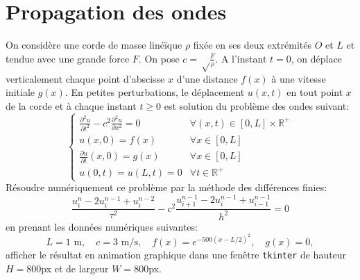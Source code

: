 \documentclass{article}
\begin{document}
\begin{center}
\end{center}
\section{Propagation des ondes}
On considère une corde de masse linéïque $\rho$  fixée en ses deux extrémités $O$ et $L$ et tendue avec une grande force $F$. On pose $c=\sqrt\frac{F}{\rho}$. A l'instant $t=0$, on déplace verticalement chaque point d'abscisse $x$  d'une distance $f(x)$ à une vitesse initiale $g(x)$. En petites perturbations, le déplacement $u(x,t)$ en tout point $x$ de la corde et à chaque instant $t\geq 0$ est solution du problème des ondes suivant:
 \[\left\{\begin{array}{ll}
 \frac{\partial^2 u}{\partial t^2}-c^2 \frac{\partial^2 u}{\partial x^2}=0 & \forall (x,t)\in [0,L]\times\mathbb{R}^+\\
 u(x,0)=f(x) & \forall x \in [0,L]\\
  \frac{\partial u}{\partial t}(x,0)=g(x) & \forall x \in [0,L]\\
 u(0,t)=u(L,t)=0 & \forall t\in \mathbb{R}^+
 \end{array}\right.\]
Résoudre numériquement ce problème par la méthode des différences finies:
\[\frac{u^n_i-2u^{n-1}_i+u^{n-2}_i}{\tau^2}-c^2\frac{u^{n-1}_{i+1}-2u^{n-1}_{i}+u^{n-1}_{i-1}}{h^2}=0\]
en prenant les données numériques suivantes:
\[L=1\mbox{ m},\quad c=3\mbox{ m/s},\quad f(x)=e^{-500 (x-L/2)^2},\quad g(x)=0,\]
afficher le résultat en animation graphique dans une fenêtre {\tt tkinter} de hauteur $H=800$px et de largeur $W=800$px.
\end{document}
